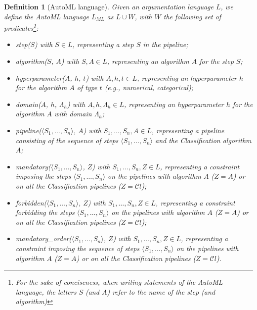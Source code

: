 \documentclass[5p,times]{elsarticle}
\newtheorem{definition}{Definition}
\begin{document}
\begin{definition}[AutoML language]
Given an argumentation language $L$, we define the \emph{AutoML language} $L_{ML}$ as $L \cup W$, with $W$ the following set of predicates\footnote{For the sake of conciseness, when writing statements of the AutoML language, the letters $S$ (and $A$) refer to the name of the step (and algorithm)}:
\begin{itemize}
    \item step($S$) with $S \in L$, representing a step $S$ in the pipeline;
    \item algorithm($S$, $A$) with $S, A \in L$, representing an algorithm $A$ for the step $S$;
    \item hyperparameter($A$, $h$, $t$) with $A, h, t \in L$, representing an hyperparameter $h$ for the algorithm $A$ of type $t$ (e.g., numerical, categorical);
    \item domain($A$, $h$, $\Lambda_h$) with $A, h, \Lambda_h \in L$, representing an hyperparameter $h$ for the algorithm $A$ with domain $\Lambda_h$;
    \item pipeline($\langle S_1, \ldots, S_n \rangle$, $A$) with $S_1, \ldots, S_n, A \in L$, representing a pipeline consisting of the sequence of steps $\langle S_1, \ldots, S_n \rangle$ and the Classification algorithm $A$;
    \item mandatory($\langle S_1, \ldots, S_n \rangle$, $Z$) with $S_1, \ldots, S_n, Z \in L$, representing a constraint imposing the steps $\langle S_1, \ldots, S_n \rangle$ on the pipelines with algorithm $A$ ($Z = A$) or on all the Classification pipelines ($Z = \mathcal{C}l$);
    \item forbidden($\langle S_1, \ldots, S_n \rangle$, $Z$) with $S_1, \ldots, S_n, Z \in L$, representing a constraint forbidding the steps $\langle S_1, \ldots, S_n \rangle$ on the pipelines with algorithm $A$ ($Z = A$) or on all the Classification pipelines ($Z = \mathcal{C}l$);
    \item mandatory\_order($\langle S_1, \ldots, S_n \rangle$, $Z$) with $S_1, \ldots, S_n, Z \in L$, representing a constraint imposing the sequence of steps $\langle S_1, \ldots, S_n \rangle$ on the pipelines with algorithm $A$ ($Z = A$) or on all the Classification pipelines ($Z = \mathcal{C}l$).
\end{itemize}
\end{definition}
\end{document}
